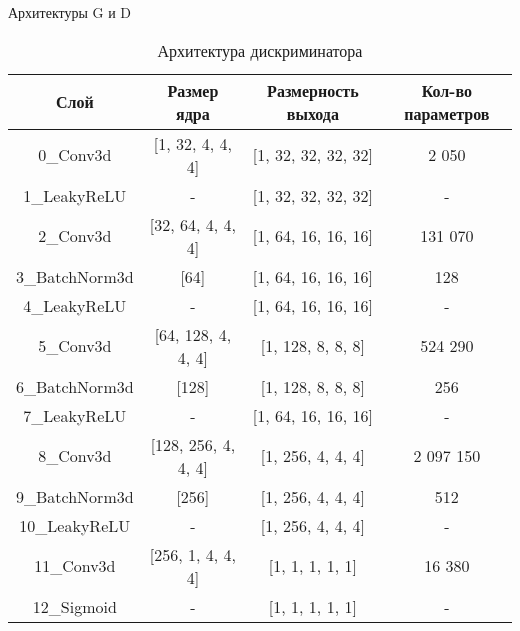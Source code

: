 \documentclass[12pt]{beamer}
\begin{document}
	\begin{frame}{Архитектуры G и D}
		\begin{table}[h]
			\tabcolsep=0.11cm
			\scriptsize
			\centering
			\begin{tabular}{|c|c|c|c|}
				\hline
				Слой & Размер ядра & Размерность выхода & Кол-во параметров \\
				\hline
				0\_Conv3d &  [1, 32, 4, 4, 4] & [1, 32, 32, 32, 32] & 2 050 \\
				1\_LeakyReLU & - & [1, 32, 32, 32, 32] & - \\
				\hline
				2\_Conv3d &  [32, 64, 4, 4, 4] & [1, 64, 16, 16, 16] & 131 070 \\
				3\_BatchNorm3d &  [64] & [1, 64, 16, 16, 16] & 128 \\
				4\_LeakyReLU & - & [1, 64, 16, 16, 16] & - \\
				\hline
				5\_Conv3d &  [64, 128, 4, 4, 4] & [1, 128, 8, 8, 8] & 524 290 \\
				6\_BatchNorm3d &  [128] & [1, 128, 8, 8, 8] & 256 \\
				7\_LeakyReLU & - & [1, 64, 16, 16, 16] & - \\
				\hline
				8\_Conv3d &  [128, 256, 4, 4, 4] & [1, 256, 4, 4, 4] & 2 097 150 \\
				9\_BatchNorm3d &  [256] & [1, 256, 4, 4, 4] & 512 \\
				10\_LeakyReLU & - & [1, 256, 4, 4, 4] & - \\
				\hline
				11\_Conv3d &  [256, 1, 4, 4, 4] & [1, 1, 1, 1, 1] & 16 380 \\
				12\_Sigmoid & - & [1, 1, 1, 1, 1] & - \\
				\hline
			\end{tabular}
			\caption{Архитектура дискриминатора}
			\label{5-d-arch}
		\end{table}
	\end{frame}
\end{document}
